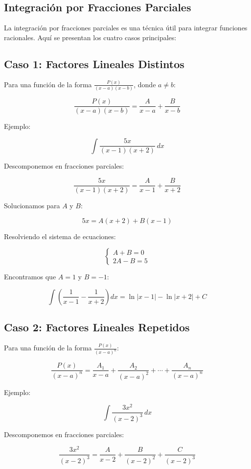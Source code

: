 \subsection{Integración por Fracciones Parciales}

La integración por fracciones parciales es una técnica útil para integrar funciones racionales. Aquí se presentan los cuatro casos principales:

\subsection*{Caso 1: Factores Lineales Distintos}

Para una función de la forma \(\frac{P(x)}{(x-a)(x-b)}\), donde \(a \neq b\):

\[
\frac{P(x)}{(x-a)(x-b)} = \frac{A}{x-a} + \frac{B}{x-b}
\]

Ejemplo:

\[
\int \frac{5x}{(x-1)(x+2)} \, dx
\]

Descomponemos en fracciones parciales:

\[
\frac{5x}{(x-1)(x+2)} = \frac{A}{x-1} + \frac{B}{x+2}
\]

Solucionamos para \(A\) y \(B\):

\[
5x = A(x+2) + B(x-1)
\]

Resolviendo el sistema de ecuaciones:

\[
\begin{cases}
A + B = 0 \\
2A - B = 5
\end{cases}
\]

Encontramos que \(A = 1\) y \(B = -1\):

\[
\int \left( \frac{1}{x-1} - \frac{1}{x+2} \right) dx = \ln|x-1| - \ln|x+2| + C
\]

\subsection*{Caso 2: Factores Lineales Repetidos}

Para una función de la forma \(\frac{P(x)}{(x-a)^n}\):

\[
\frac{P(x)}{(x-a)^n} = \frac{A_1}{x-a} + \frac{A_2}{(x-a)^2} + \cdots + \frac{A_n}{(x-a)^n}
\]

Ejemplo:

\[
\int \frac{3x^2}{(x-2)^3} \, dx
\]

Descomponemos en fracciones parciales:

\[
\frac{3x^2}{(x-2)^3} = \frac{A}{x-2} + \frac{B}{(x-2)^2} + \frac{C}{(x-2)^3}
\]


